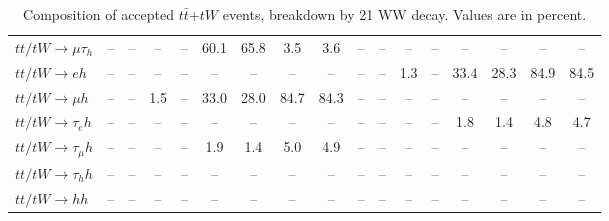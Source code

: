 \begin{sidewaystable}[p]
\begin{tabular}{|l|cc|cc|cc|cc|cc|cc|cc|cc|}
    $tt/tW \to \mu\tau_{h}$            &   -- &   -- &   -- &   -- & 60.1 & 65.8 &  3.5 &  3.6 &   -- &   -- &   -- &   -- &   -- &   -- &   -- &   -- \\ 
    $tt/tW \to eh$                     &   -- &   -- &   -- &   -- &   -- &   -- &   -- &   -- &   -- &   -- &  1.3 &   -- & 33.4 & 28.3 & 84.9 & 84.5 \\ 
    $tt/tW \to \mu h$                  &   -- &   -- &  1.5 &   -- & 33.0 & 28.0 & 84.7 & 84.3 &   -- &   -- &   -- &   -- &   -- &   -- &   -- &   -- \\ 
    $tt/tW \to \tau_{e}h$              &   -- &   -- &   -- &   -- &   -- &   -- &   -- &   -- &   -- &   -- &   -- &   -- &  1.8 &  1.4 &  4.8 &  4.7 \\ 
    $tt/tW \to \tau_{\mu}h$            &   -- &   -- &   -- &   -- &  1.9 &  1.4 &  5.0 &  4.9 &   -- &   -- &   -- &   -- &   -- &   -- &   -- &   -- \\ 
    $tt/tW \to \tau_{h}h$              &   -- &   -- &   -- &   -- &   -- &   -- &   -- &   -- &   -- &   -- &   -- &   -- &   -- &   -- &   -- &   -- \\ 
    $tt/tW \to hh$                     &   -- &   -- &   -- &   -- &   -- &   -- &   -- &   -- &   -- &   -- &   -- &   -- &   -- &   -- &   -- &   -- \\ 

    \hline
    \end{tabular}
    \caption{Composition of accepted $t\bar{t}$+$tW$ events, breakdown by 21 WW decay.  Values are in percent.}
    \label{sigcomp}
    
\end{sidewaystable}
